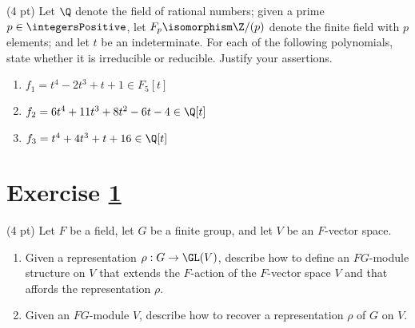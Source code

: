 (4 pt) Let $\Q$ denote the field of rational numbers; given a prime $p \in \integersPositive$, let $F_{p} \isomorphism \Z / (p)$ denote the finite field with $p$ elements; and let $t$ be an indeterminate. For each of the following polynomials, state whether it is irreducible or reducible. Justify your assertions.
\begin{enumerate}[label=(\alph*)]
\item\label{itm : me01q3a} $f_{1} = t^{4} - 2 t^{3} + t + 1 \in F_{5}[t]$
\item\label{itm : me01q3b} $f_{2} = 6 t^{4} + 11 t^{3} + 8 t^{2} - 6 t - 4 \in \Q[t]$
\item\label{itm : me01q3c} $f_{3} = t^{4} + 4 t^{3} + t + 16 \in \Q[t]$
\end{enumerate}




\section{Exercise \ref{sec : me01q4}}
\label{sec : me01q4}

(4 pt) Let $F$ be a field, let $G$ be a finite group, and let $V$ be an $F$-vector space.
\begin{enumerate}[label=(\alph*)]
\item\label{itm : me01q4a} Given a representation $\rho : G \rightarrow \GL(V)$, describe how to define an $F G$-module structure on $V$ that extends the $F$-action of the $F$-vector space $V$ and that affords the representation $\rho$.
\item\label{itm : me01q4a} Given an $F G$-module $V$, describe how to recover a representation $\rho$ of $G$ on $V$.
\end{enumerate}

